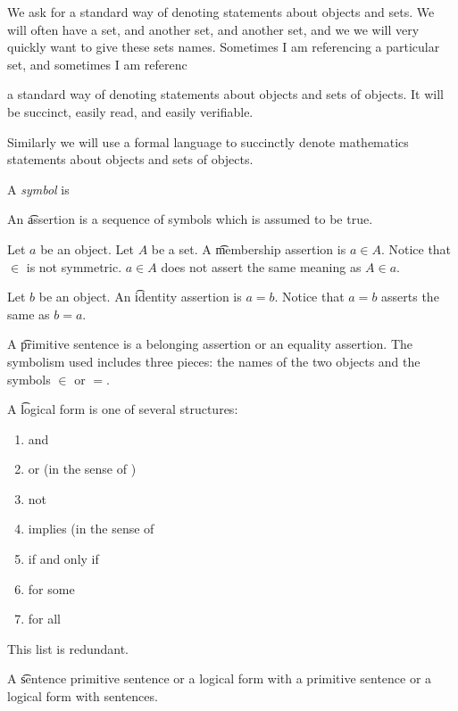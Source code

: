 We ask for a standard way of denoting statements about objects and sets.
We will often have a set, and another set, and another set, and we we will very quickly want to give these sets names.
Sometimes I am referencing a particular set, and sometimes I am referenc

 a standard way of denoting statements about objects and sets of objects.
It will be succinct, easily read, and easily verifiable.


Similarly we will use a formal language to succinctly denote mathematics statements about objects and sets of objects.



A \textit{symbol} is


An \t{assertion} is a sequence of symbols which is assumed to be true.

Let $a$ be an object.
Let $A$ be a set.
A \t{membership assertion} is $a \in A$.
Notice that $\in$ is not symmetric.
$a \in A$ does not assert the same meaning as $A \in a$.

Let $b$ be an object.
An \t{identity assertion}
is $a = b$.
Notice that $a = b$
asserts the same as $b = a$.

A \t{primitive sentence} is a belonging assertion or an equality assertion.
The symbolism used includes three pieces: the names of the two objects and the symbols $\in$ or $=$.

A \t{logical form} is one of several structures:

\begin{enumerate}

  \item

    and

  \item

    or (in the sense of )

  \item

    not

  \item

    implies (in the sense of 

  \item

    if and only if

  \item

    for some

  \item

    for all
\end{enumerate}

This list is redundant.

A \t{sentence} primitive sentence or a logical form with a primitive sentence or a logical form with sentences.
